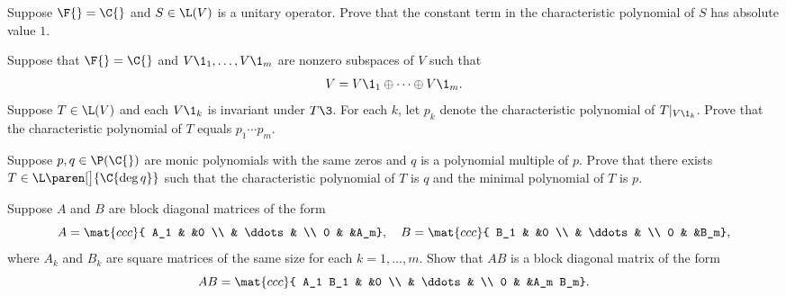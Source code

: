 \exercise
Suppose $\F{} = \C{}$ and $S \in \L(V)$ is a unitary operator. Prove that the constant term in the characteristic polynomial of $S$ has absolute value $1$.

\exercise
Suppose that $\F{} = \C{}$ and $V\1_1, \dots, V\1_m$ are nonzero subspaces of $V$ such that
\[
V = V\1_1 \oplus \dots \oplus V\1_m.
\]
Suppose $T \in \L(V)$ and each $V\1_k$ is invariant under $T\3$. For each $k$, let $p_k$ denote the characteristic polynomial of $T|_{V\1_k}$. Prove that
the characteristic polynomial of $T$ equals $p_1 \dotsm p_m$.


\exercise
Suppose $p, q \in \P(\C{})$ are monic polynomials with the same zeros and $q$ is a polynomial multiple of $p$. Prove that there exists $T \in \L\paren[\big]{\C{\deg q}}$ such that the characteristic polynomial of $T$ is $q$ and the minimal polynomial of $T$ is $p$.


\exercise
Suppose $A$ and $B$ are block diagonal matrices of the form\label{blockmult}
\[
A = \mat{ccc}{
A_1 & &0 \\
& \ddots & \\
0 & &A_m},
\quad B = \mat{ccc}{
B_1 & &0 \\
& \ddots & \\
0 & &B_m},
\]
where $A_k$ and $B_k$ are square matrices of the same size for each $k = 1, \dots, m$. Show that $AB$ is a
block diagonal matrix of the form
\[
AB = \mat{ccc}{
A_1 B_1 & &0 \\
& \ddots & \\
0 & &A_m B_m}.
\]


